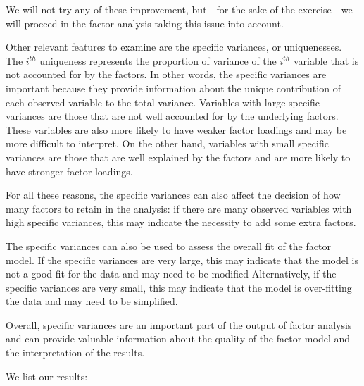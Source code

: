 \documentclass[
  letterpaper,
  DIV=11,
  numbers=noendperiod]{scrartcl}
\begin{document}
We will not try any of these improvement, but - for the sake of the
exercise - we will proceed in the factor analysis taking this issue into
account.

Other relevant features to examine are the specific variances, or
uniquenesses. The \(i^{th}\) uniqueness represents the proportion of
variance of the \(i^{th}\) variable that is not accounted for by the
factors. In other words, the specific variances are important because
they provide information about the unique contribution of each observed
variable to the total variance. Variables with large specific variances
are those that are not well accounted for by the underlying factors.
These variables are also more likely to have weaker factor loadings and
may be more difficult to interpret. On the other hand, variables with
small specific variances are those that are well explained by the
factors and are more likely to have stronger factor loadings.

For all these reasons, the specific variances can also affect the
decision of how many factors to retain in the analysis: if there are
many observed variables with high specific variances, this may indicate
the necessity to add some extra factors.

The specific variances can also be used to assess the overall fit of the
factor model. If the specific variances are very large, this may
indicate that the model is not a good fit for the data and may need to
be modified Alternatively, if the specific variances are very small,
this may indicate that the model is over-fitting the data and may need
to be simplified.

Overall, specific variances are an important part of the output of
factor analysis and can provide valuable information about the quality
of the factor model and the interpretation of the results.

We list our results:
\end{document}
